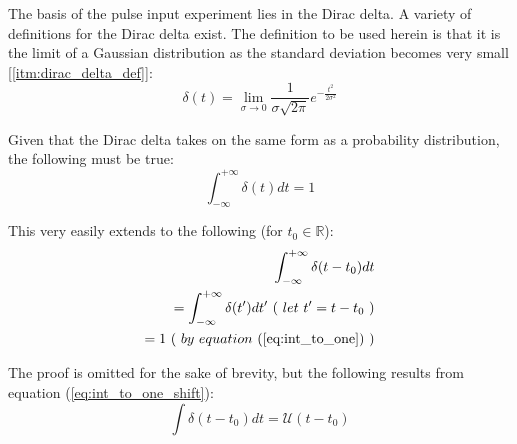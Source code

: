 The basis of the pulse input experiment lies in the Dirac delta. A variety of definitions for the Dirac delta exist. The definition to be used herein is that it is the limit of a Gaussian distribution as the standard deviation becomes very small [\ref{itm:dirac_delta_def}]:
\begin{equation}
	\label{eq:dirac_delta_def}
	\delta(t) = \lim_{\sigma \to 0} \frac{ 1 }{ \sigma \sqrt{ 2 \pi } } e^{ - \frac{ t^2 }{ 2\sigma^2 } }
\end{equation}


Given that the Dirac delta takes on the same form as a probability distribution, the following must be true:
\begin{equation}
	\label{eq:int_to_one}
	\int_{-\infty}^{+\infty}{\delta(t)dt} = 1
\end{equation}

This very easily extends to the following (for $t_0 \in \mathbb{R}$):
\begin{equation*}
	\label{eq:int_to_one_shift}
	\begin{aligned}
		\int_{-\infty}^{+\infty}{\delta(t-t_0)dt} \\
		= \int_{-\infty}^{+\infty}{\delta(t')dt'} \ ( \ let \ t' = t - t_0 \ ) \\
		= 1 \ ( \ by \ equation \ (\ref{eq:int_to_one}) \ )
	\end{aligned}
\end{equation*}

The proof is omitted for the sake of brevity, but the following results from equation (\ref{eq:int_to_one_shift}):
\begin{equation}
	\label{eq:int_of_dirac_is_step}
	\int \delta( t - t_0 )dt = \mathcal{U}( t - t_0 )
\end{equation}

